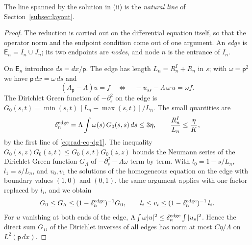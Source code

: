 The line spanned by the solution in (ii) is the \emph{natural line} of
Section~\ref{subsec:layout}.

\begin{proof}
The reduction is carried out on the differential equation itself, so
that the operator norm and the endpoint condition come out of one
argument. An \emph{edge} is $\mathsf E_n=I_n\cup J_n$; its two
endpoints are \emph{nodes}, and node $n$ is the entrance of $I_n$.

On $\mathsf E_n$ introduce $ds=dx/\mathsf p$. The edge has length
$L_n=R_n^I+R_n$ in $s$; with $\omega=\mathsf p^2$ we have
$\mathsf p\,dx=\omega\,ds$ and
\[
 (A_{\mathsf p}-\Lambda)u=f
 \quad\Longleftrightarrow\quad -u_{ss}-\Lambda\,\omega\,u=\omega f .
\]
The Dirichlet Green function of $-\partial_s^2$ on the edge is
$G_0(s,t)=\min(s,t)\,[L_n-\max(s,t)]/L_n$. The small quantities are
\[
 \delta_n^{\rm edge}=\Lambda\int\omega(s)\,G_0(s,s)\,ds\le3\eta,
 \qquad \frac{R_n^I}{L_n}\le\frac\eta K ,
\]
by the first line of \eqref{eq:rad-eq-dg1}. The inequality
$G_0(s,z)G_0(z,t)\le G_0(s,t)G_0(z,z)$ bounds the Neumann series of
the Dirichlet Green function $G_\Lambda$ of $-\partial_s^2-\Lambda\omega$
term by term. With $l_0=1-s/L_n$, $l_1=s/L_n$, and $v_0,v_1$ the
solutions of the homogeneous equation on the edge with boundary values
$(1,0)$ and $(0,1)$, the same argument applies with one factor
replaced by $l_i$, and we obtain
\begin{equation}\label{eq:rad-eq-dg2}
 G_0\le G_\Lambda\le(1-\delta_n^{\rm edge})^{-1}G_0,
 \qquad l_i\le v_i\le(1-\delta_n^{\rm edge})^{-1}\,l_i .
\end{equation}
For $u$ vanishing at both ends of the edge,
$\Lambda\int\omega|u|^2\le\delta_n^{\rm edge}\int|u_s|^2$. Hence the
direct sum $G_D$ of the Dirichlet inverses of all edges has norm at
most $C\eta/\Lambda$ on $L^2(\mathsf p\,dx)$.


\end{proof}
